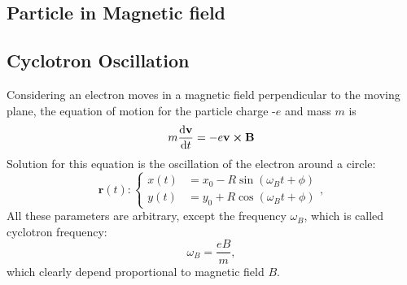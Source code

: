 \documentclass[unnumsec,webpdf,modern,large]{mam-authoring-template}%
\theoremstyle{thmstyleone}%
\theoremstyle{thmstyletwo}%
\theoremstyle{thmstylethree}%
\begin{document}
	\begin{appendices}	
	\section{Particle in Magnetic field}\label{particle in field}
\subsection{Cyclotron Oscillation}\label{Cyclotron}
\quad Considering an electron moves in a magnetic field perpendicular to the moving plane, the equation of motion for the particle charge -\(e\) and mass \(m\) is
\begin{equation}\label{Newton only B}
	m\dv{\textbf{v}}{t} = -e\textbf{v}\cross \textbf{B}
\end{equation}
\quad Solution for this equation is the oscillation of the electron around a circle:
\begin{equation}
	\textbf{r}(t) :
\begin{cases}\label{r classical}
	x(t)&= x_0 - R\sin(\omega_B t +\phi)\\
	y(t)&= y_0 + R\cos(\omega_B t +\phi)
\end{cases},
\end{equation}
\quad All these parameters are arbitrary, except the frequency \(\omega_B\), which is called cyclotron frequency:
\begin{equation}\label{cyclotron def}
	\omega_B = \frac{eB}{m},
\end{equation}
which clearly depend proportional to magnetic field \(B\).

\end{appendices}
\end{document}
